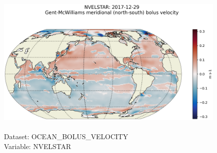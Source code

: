 \begin{figure}[H]
\centering
\includegraphics[scale=0.5]{../images/plots/latlon_plots/Gent-McWilliams_Ocean_Bolus_Velocity/NVELSTAR.png}
\caption{\\Dataset: OCEAN\_BOLUS\_VELOCITY\\Variable: NVELSTAR}
\label{tab:table-OCEAN_BOLUS_VELOCITY_NVELSTAR-Plot}
\end{figure}
\pagebreak
